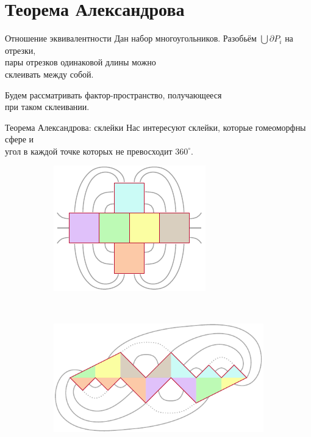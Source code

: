 \section{Теорема Александрова}

\begin{frame}{Отношение эквивалентности}
	Дан набор многоугольников. Разобьём \(\bigcup \partial P_i\) на отрезки,\\
	пары отрезков одинаковой длины можно\\
	склеивать между собой.

	Будем рассматривать \alert{фактор-пространство,} получающееся\\
	при таком склеивании.
\end{frame}


\begin{frame}{Теорема Александрова: склейки}
	Нас интересуют склейки, которые гомеоморфны сфере и\\
	угол в каждой точке которых не превосходит \(360^\circ\).
\begin{figure}
	\centering
	\begin{subfigure}[m]{0.41\textwidth}
		\centering
		\includegraphics[scale=1.12]{figs_pres/alex_example_1}
	\end{subfigure}
~
	\centering
	\begin{subfigure}[m]{0.48\textwidth}
		\centering
		\includegraphics[scale=0.81]{figs_pres/alex_example_stefan_1}
	\end{subfigure}
\end{figure}
\end{frame}


